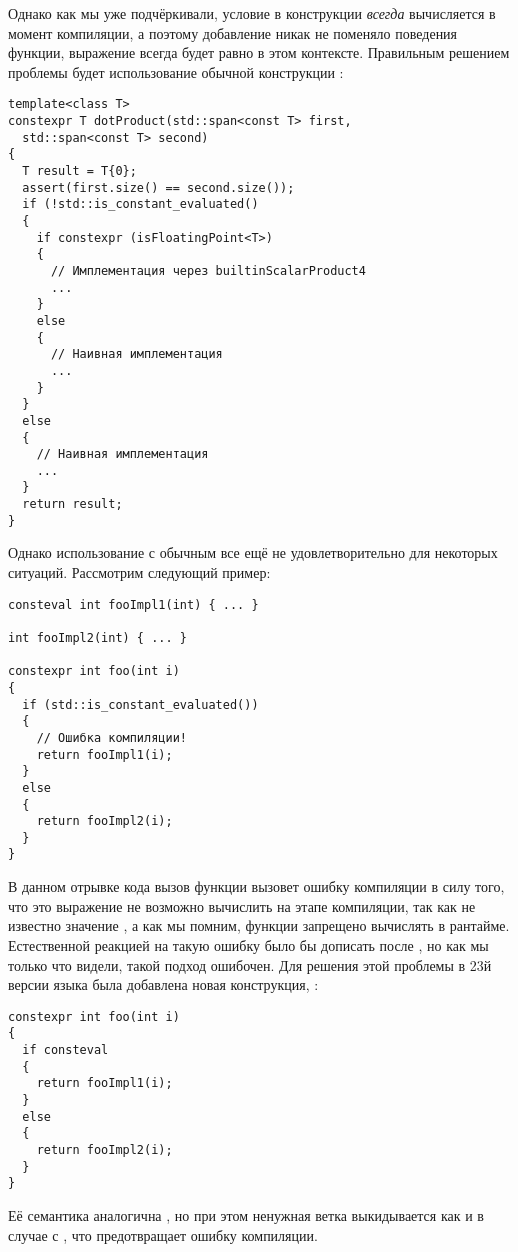 Однако как мы уже подчёркивали, условие в конструкции  \textit{всегда} вычисляется в момент компиляции, а поэтому добавление  никак не поменяло поведения функции, выражение  всегда будет равно  в этом контексте.
Правильным решением проблемы будет использование обычной конструкции :
\begin{verbatim}
template<class T>
constexpr T dotProduct(std::span<const T> first,
  std::span<const T> second)
{
  T result = T{0};
  assert(first.size() == second.size());
  if (!std::is_constant_evaluated()
  {
    if constexpr (isFloatingPoint<T>)
    {
      // Имплементация через builtinScalarProduct4
      ...
    }
    else
    {
      // Наивная имплементация
      ...
    }
  }
  else
  {
    // Наивная имплементация
    ...
  }
  return result;
}
\end{verbatim}
Однако использование  с обычным  все ещё не удовлетворительно для некоторых ситуаций.
Рассмотрим следующий пример:
\begin{verbatim}
consteval int fooImpl1(int) { ... }

int fooImpl2(int) { ... }

constexpr int foo(int i)
{
  if (std::is_constant_evaluated())
  {
    // Ошибка компиляции!
    return fooImpl1(i);
  }
  else
  {
    return fooImpl2(i);
  }
}
\end{verbatim}
В данном отрывке кода вызов функции  вызовет ошибку компиляции в силу того, что это выражение не возможно вычислить на этапе компиляции, так как не известно значение , а как мы помним,  функции запрещено вычислять в рантайме.
Естественной реакцией на такую ошибку было бы дописать  после , но как мы только что видели, такой подход ошибочен.
Для решения этой проблемы в 23й версии языка была добавлена новая конструкция, :
\begin{verbatim}
constexpr int foo(int i)
{
  if consteval
  {
    return fooImpl1(i);
  }
  else
  {
    return fooImpl2(i);
  }
}
\end{verbatim}
Её семантика аналогична , но при этом ненужная ветка выкидывается как и в случае с , что предотвращает ошибку компиляции.

